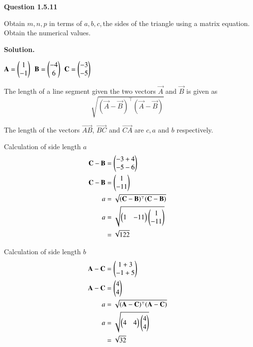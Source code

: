 \documentclass[journal,12pt,twocolumn]{IEEEtran}
\theoremstyle{remark}
\begin{document}



\maketitle
\textbf{Question 1.5.11}

\vspace{0.2cm}
Obtain $m,n,p$ in terms of $a,b,c$,\,the sides of the triangle using a matrix equation. Obtain the numerical values.

\vspace{0.3cm}
\textbf{Solution.}

\vspace{0.4cm}
$\mathbf{A} = \begin{pmatrix}1\\-1\end{pmatrix}$ \,$\mathbf{B} = \begin{pmatrix}-4\\6\end{pmatrix}$ \,$\mathbf{C} = \begin{pmatrix}-3\\-5\end{pmatrix}$

\vspace{0.3cm}
The length of a line segment given the two vectors $\vec{A}$ and $\vec{B}$ is given as
$$\sqrt{(\vec{A}-\vec{B})^{\top}(\vec{A}-\vec{B})}$$

\vspace{0.3cm}
The length of the vectors $\vec{AB}$, $\vec{BC}$ and $\vec{CA}$ are $c,a$ and $b$ respectively.

\vspace{0.3cm}
Calculation of side length $a$
\begin{align}
\mathbf{C}-\mathbf{B} &= \begin{pmatrix}-3+4\\-5-6\end{pmatrix}\\
\mathbf{C}-\mathbf{B} &= \begin{pmatrix}1\\-11\end{pmatrix}\\
a &= \sqrt{(\mathbf{C}-\mathbf{B})^{\top}(\mathbf{C}-\mathbf{B})}\\
a &= \sqrt{\begin{pmatrix}1&-11\end{pmatrix}\begin{pmatrix}1\\-11\end{pmatrix}}\\
&= \sqrt{122}
\end{align}

\vspace{0.3cm}
Calculation of side length $b$
\begin{align}
\mathbf{A}-\mathbf{C} &= \begin{pmatrix}1+3\\-1+5\end{pmatrix}\\
\mathbf{A}-\mathbf{C} &= \begin{pmatrix}4\\4\end{pmatrix}\\
a &= \sqrt{(\mathbf{A}-\mathbf{C})^{\top}(\mathbf{A}-\mathbf{C})}\\
a &= \sqrt{\begin{pmatrix}4&4\end{pmatrix}\begin{pmatrix}4\\4\end{pmatrix}}\\
&= \sqrt{32}
\end{align}
\end{document}
